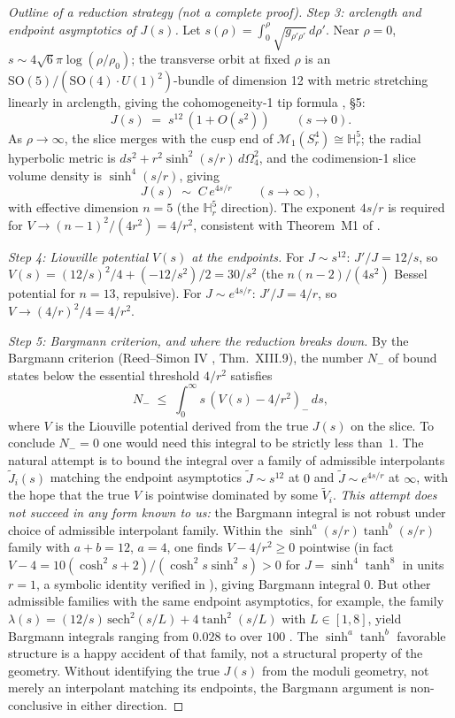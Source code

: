 \documentclass[11pt,letterpaper]{article}
\theoremstyle{definition}
\newcommand{\bbH}{\mathbb{H}}
\newcommand{\cM}{\mathcal{M}}
\begin{document}
\begin{proof}[Outline of a reduction strategy (not a complete proof)]
\emph{Step 3: arclength and endpoint asymptotics of $J(s)$.} Let $s(\rho) = \int_0^\rho \sqrt{g_{\rho'\rho'}}\,d\rho'$. Near $\rho = 0$, $s \sim 4\sqrt{6}\pi\log(\rho/\rho_0)$; the transverse orbit at fixed $\rho$ is an $\mathrm{SO}(5)/(\mathrm{SO}(4)\cdot U(1)^2)$-bundle of dimension 12 with metric stretching linearly in arclength, giving the cohomogeneity-1 tip formula \cite{GP1989}, \S 5:
\[
J(s) \;=\; s^{12}\,(1 + O(s^2))\qquad (s \to 0).
\]
As $\rho \to \infty$, the slice merges with the cusp end of $\cM_1(S^4_r) \cong \bbH^5_r$; the radial hyperbolic metric is $ds^2 + r^2\sinh^2(s/r)\,d\Omega_4^2$, and the codimension-1 slice volume density is $\sinh^4(s/r)$, giving
\[
J(s) \;\sim\; C\,e^{4s/r}\qquad (s \to \infty),
\]
with effective dimension $n = 5$ (the $\bbH^5_r$ direction). The exponent $4s/r$ is required for $V \to (n-1)^2/(4r^2) = 4/r^2$, consistent with Theorem~M1 of \cite{bonfioli-core}.

\emph{Step 4: Liouville potential $V(s)$ at the endpoints.} For $J \sim s^{12}$: $J'/J = 12/s$, so $V(s) = (12/s)^2/4 + (-12/s^2)/2 = 30/s^2$ (the $n(n-2)/(4s^2)$ Bessel potential for $n = 13$, repulsive). For $J \sim e^{4s/r}$: $J'/J = 4/r$, so $V \to (4/r)^2/4 = 4/r^2$.

\emph{Step 5: Bargmann criterion, and where the reduction breaks down.} By the Bargmann criterion (Reed--Simon IV \cite{ReedSimonIV}, Thm.~XIII.9), the number $N_-$ of bound states below the essential threshold $4/r^2$ satisfies
\[
N_- \;\le\; \int_0^\infty s\,(V(s) - 4/r^2)_-\,ds,
\]
where $V$ is the Liouville potential derived from the true $J(s)$ on the slice. To conclude $N_- = 0$ one would need this integral to be strictly less than~$1$. The natural attempt is to bound the integral over a family of admissible interpolants $\widetilde J_i(s)$ matching the endpoint asymptotics $\widetilde J \sim s^{12}$ at $0$ and $\widetilde J \sim e^{4s/r}$ at $\infty$, with the hope that the true $V$ is pointwise dominated by some $\widetilde V_i$. \emph{This attempt does not succeed in any form known to us:} the Bargmann integral is not robust under choice of admissible interpolant family. Within the $\sinh^a(s/r)\tanh^b(s/r)$ family with $a+b=12$, $a=4$, one finds $V - 4/r^2 \ge 0$ pointwise (in fact $V - 4 = 10(\cosh^2 s + 2)/(\cosh^2 s \sinh^2 s) > 0$ for $J = \sinh^4\tanh^8$ in units $r=1$, a symbolic identity verified in \cite{m2-bargmann-true-V}), giving Bargmann integral $0$. But other admissible families with the same endpoint asymptotics, for example, the family $\lambda(s) = (12/s)\,\mathrm{sech}^2(s/L) + 4\tanh^2(s/L)$ with $L \in [1, 8]$, yield Bargmann integrals ranging from $0.028$ to over $100$ \cite{m2-bargmann-true-V}. The $\sinh^a\tanh^b$ favorable structure is a happy accident of that family, not a structural property of the geometry. Without identifying the true $J(s)$ from the moduli geometry, not merely an interpolant matching its endpoints, the Bargmann argument is non-conclusive in either direction.


\end{proof}
\end{document}
